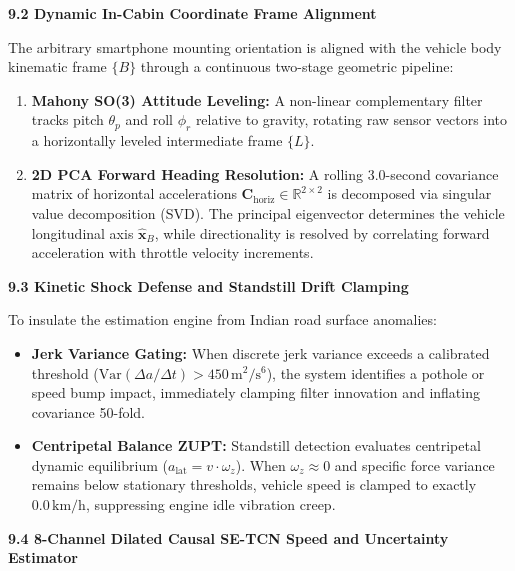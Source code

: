 \documentclass[11pt,a4paper]{article}
\begin{document}
\textbf{9.2 Dynamic In-Cabin Coordinate Frame Alignment}

The arbitrary smartphone mounting orientation is aligned with the vehicle body kinematic frame $\{B\}$ through a continuous two-stage geometric pipeline:
\begin{enumerate}[label=(\alph*),leftmargin=0.7cm,itemsep=1.2pt]
\item \textbf{Mahony SO(3) Attitude Leveling:} A non-linear complementary filter tracks pitch $\theta_p$ and roll $\phi_r$ relative to gravity, rotating raw sensor vectors into a horizontally leveled intermediate frame $\{L\}$.
\item \textbf{2D PCA Forward Heading Resolution:} A rolling 3.0-second covariance matrix of horizontal accelerations $\mathbf{C}_{\text{horiz}} \in \mathbb{R}^{2 \times 2}$ is decomposed via singular value decomposition (SVD). The principal eigenvector determines the vehicle longitudinal axis $\hat{\mathbf{x}}_B$, while directionality is resolved by correlating forward acceleration with throttle velocity increments.
\end{enumerate}

\textbf{9.3 Kinetic Shock Defense and Standstill Drift Clamping}

To insulate the estimation engine from Indian road surface anomalies:
\begin{itemize}[leftmargin=0.7cm,itemsep=1.2pt]
\item \textbf{Jerk Variance Gating:} When discrete jerk variance exceeds a calibrated threshold ($\text{Var}(\Delta a / \Delta t) > 450\,\text{m}^2/\text{s}^6$), the system identifies a pothole or speed bump impact, immediately clamping filter innovation and inflating covariance 50-fold.
\item \textbf{Centripetal Balance ZUPT:} Standstill detection evaluates centripetal dynamic equilibrium ($a_{\text{lat}} = v \cdot \omega_z$). When $\omega_z \approx 0$ and specific force variance remains below stationary thresholds, vehicle speed is clamped to exactly $0.0\,\text{km/h}$, suppressing engine idle vibration creep.
\end{itemize}
\newpage

\setlength{\abovedisplayskip}{2.5pt}
\setlength{\belowdisplayskip}{2.5pt}

\textbf{9.4 8-Channel Dilated Causal SE-TCN Speed and Uncertainty Estimator}
\end{document}
